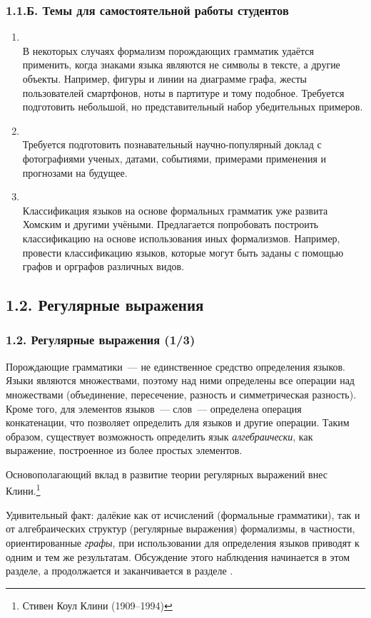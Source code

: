 \begin{frame}
\frametitle{1.1.Б. Темы для самостоятельной работы студентов}

\begin{enumerate}
\item  {} \\
В некоторых случаях формализм порождающих
грамматик удаётся применить, когда знаками языка являются не символы в тексте, а другие объекты. Например, фигуры и линии на диаграмме графа, 
жесты пользователей смартфонов, ноты в партитуре и тому подобное. 
Требуется подготовить небольшой, но представительный набор убедительных примеров.

\item {} \\ 
Требуется подготовить познавательный научно-популярный доклад с фотографиями ученых,  датами, событиями, примерами применения и прогнозами на будущее.

\item {} \\ 
Классификация языков на основе формальных грамматик уже развита Хомским и другими учёными.
Предлагается попробовать построить классификацию на основе использования 
иных формализмов. Например, провести классификацию языков,
которые могут быть заданы с помощью графов и орграфов различных видов.

\end{enumerate}

\end{frame}


\subsection{1.2. Регулярные выражения}
\begin{frame}
\frametitle{1.2. Регулярные выражения (1/3)}

Порождающие грамматики~--- не единственное средство определения
языков. Языки являются множествами, поэтому над ними определены
все операции над множествами 
(объединение, пересечение, разность и 
симметрическая разность). Кроме того, для
элементов языков~--- слов~--- определена операция конкатенации,
что позволяет определить для языков и другие операции. 
Таким образом,
существует возможность определить язык
{\em алгебраически}, как выражение,
построенное из более простых элементов.

Основополагающий вклад в развитие теории регулярных выражений 
внес Клини.\footnote{Стивен Коул Клини (1909--1994)}

\medskip
Удивительный факт: далёкие как от исчислений (формальные грамматики),
так и от алгебраических структур (регулярные выражения) формализмы,
в частности, ориентированные {\em графы}, при использовании для определения 
языков приводят к одним и тем же результатам. Обсуждение этого наблюдения
начинается в этом разделе, а продолжается и заканчивается в разделе
.     

\end{frame}

